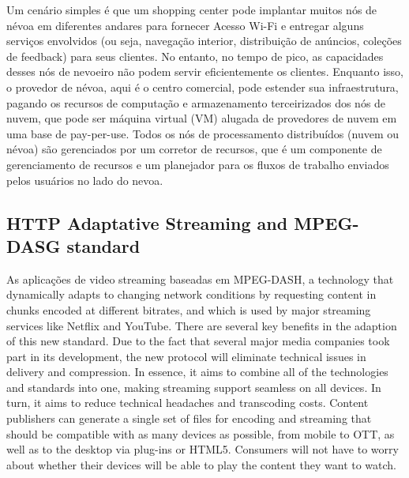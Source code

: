 Um cenário simples é que um shopping center pode implantar muitos nós de névoa em diferentes andares para fornecer Acesso Wi-Fi e entregar alguns serviços envolvidos (ou seja, navegação interior, distribuição de anúncios, coleções de feedback) para seus clientes. No entanto, no tempo de pico, as capacidades desses nós de nevoeiro não podem servir eficientemente os clientes. Enquanto isso, o provedor de névoa, aqui é o centro comercial, pode estender sua infraestrutura, pagando os recursos de computação e armazenamento terceirizados dos nós de nuvem, que pode ser máquina virtual (VM) alugada de provedores de nuvem em uma base de pay-per-use. Todos os nós de processamento distribuídos (nuvem ou névoa) são gerenciados por um corretor de recursos, que é um componente de gerenciamento de recursos e um planejador para os fluxos de trabalho enviados pelos usuários no lado do nevoa. 

\subsection{HTTP Adaptative Streaming and MPEG-DASG standard}
\label{sec:has-dash}

As aplicações de video streaming baseadas em MPEG-DASH, a technology that dynamically adapts to changing network conditions by requesting content in chunks encoded at different bitrates, and which is used by major streaming services like Netflix and YouTube.
There are several key benefits in the adaption of this new standard. Due to the fact that several major media companies took part in its development, the new protocol will eliminate technical issues in delivery and compression. In essence, it aims to combine all of the technologies and standards into one, making streaming support seamless on all devices. In turn, it aims to reduce technical headaches and transcoding costs. Content publishers can generate a single set of files for encoding and streaming that should be compatible with as many devices as possible, from mobile to OTT, as well as to the desktop via plug-ins or HTML5. Consumers will not have to worry about whether their devices will be able to play the content they want to watch.

